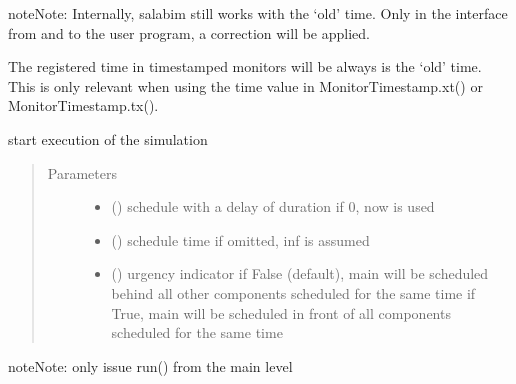 \documentclass[letterpaper,10pt,english]{sphinxmanual}
\begin{document}
\begin{fulllineitems}
\begin{fulllineitems}
\begin{quote}
\begin{description}
\end{description}\end{quote}

\begin{sphinxadmonition}{note}{Note:}
Internally, salabim still works with the ‘old’ time. Only in the interface
from and to the user program, a correction will be applied.

The registered time in timestamped monitors will be always is the ‘old’ time.
This is only relevant when using the time value in MonitorTimestamp.xt() or
MonitorTimestamp.tx().
\end{sphinxadmonition}

\end{fulllineitems}


\begin{fulllineitems}
\label{\detokenize{Reference:salabim.Environment.run}}
start execution of the simulation
\begin{quote}\begin{description}
\item[{Parameters}] \leavevmode\begin{itemize}
\item {} 
 () \textendash{} schedule with a delay of duration 
if 0, now is used

\item {} 
 () \textendash{} schedule time 
if omitted, inf is assumed

\item {} 
 () \textendash{} urgency indicator 
if False (default), main will be scheduled
behind all other components scheduled
for the same time 
if True, main will be scheduled
in front of all components scheduled
for the same time

\end{itemize}

\end{description}\end{quote}

\begin{sphinxadmonition}{note}{Note:}
only issue run() from the main level
\end{sphinxadmonition}


\end{fulllineitems}
\end{fulllineitems}
\end{document}
